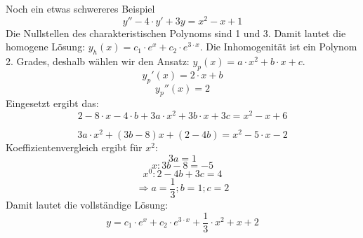 \documentclass[
	11pt, %
]{beamer}
\begin{document}
\begin{frame}
	\begin{exampleblock}{Noch ein etwas schwereres Beispiel}
		\begin{equation}
			y''-4\cdot y'+3y=x^2-x+1
		\end{equation}
		Die Nullstellen des charakteristischen Polynoms sind 1 und 3. Damit lautet die homogene L\"osung: $y_h(x)=c_1\cdot e^x+c_2\cdot e^{3\cdot x}$. Die Inhomogenit\"at ist ein Polynom 2. Grades, deshalb w\"ahlen wir den Ansatz: $y_p(x)=a\cdot x^2+b\cdot x+c$.
		\begin{equation}
			y_p'(x)=2\cdot x+b
		\end{equation}
		\begin{equation}
			y_p''(x)=2
		\end{equation}
		Eingesetzt ergibt das:
		\begin{equation}
			2-8\cdot x-4\cdot b+3a\cdot x^2+3b\cdot x+3c=x^2-x+6
		\end{equation}
	\end{exampleblock}
\end{frame}
\begin{frame}
	\begin{exampleblock}{}
		\begin{equation}
			3a\cdot x^2+(3b-8)x+(2-4b)=x^2-5\cdot x-2
		\end{equation}
		Koeffizientenvergleich ergibt f\"ur $x^2$:
		\begin{equation}
			3a=1
		\end{equation}
		\begin{equation}
			x: 3b-8=-5
		\end{equation}
		\begin{equation}
			x^0: 2-4b+3c=4
		\end{equation}
		\begin{equation}
			\Rightarrow a=\frac{1}{3}; b=1; c=2
		\end{equation}
		Damit lautet die vollst\"andige L\"osung:
		\begin{equation}
		y=c_1\cdot e^x+c_2\cdot e^{3\cdot x}+\frac{1}{3}\cdot x^2+x+2
		\end{equation}
	\end{exampleblock}
\end{frame}
\end{document}
